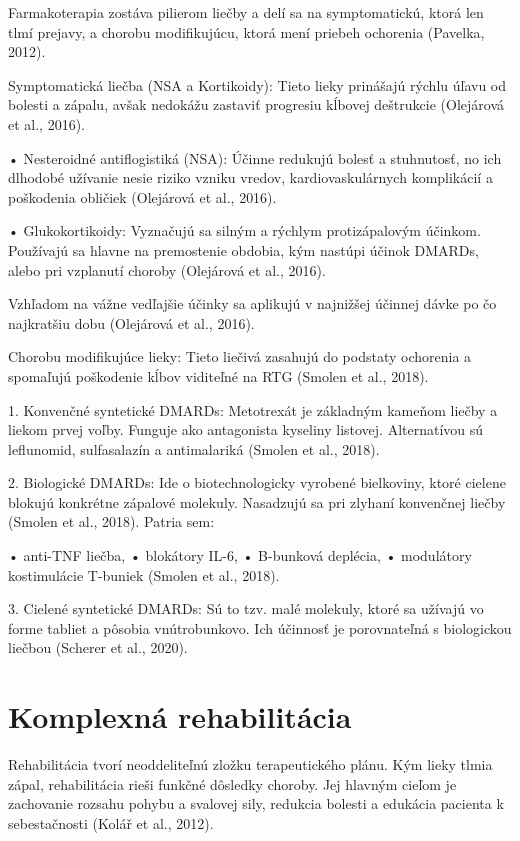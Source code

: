 Farmakoterapia zostáva pilierom liečby a delí sa na symptomatickú, ktorá len tlmí prejavy, a chorobu modifikujúcu, ktorá mení priebeh ochorenia (Pavelka, 2012). 

Symptomatická liečba (NSA a Kortikoidy): Tieto lieky prinášajú rýchlu úľavu od bolesti a zápalu, avšak nedokážu zastaviť progresiu kĺbovej deštrukcie (Olejárová et al., 2016). 

• Nesteroidné antiflogistiká (NSA): Účinne redukujú bolesť a stuhnutosť, no ich dlhodobé užívanie nesie riziko vzniku vredov, kardiovaskulárnych komplikácií a poškodenia obličiek (Olejárová et al., 2016). 

• Glukokortikoidy: Vyznačujú sa silným a rýchlym protizápalovým účinkom. Používajú sa hlavne na premostenie obdobia, kým nastúpi účinok DMARDs, alebo pri vzplanutí choroby (Olejárová et al., 2016). 

Vzhľadom na vážne vedľajšie účinky sa aplikujú v najnižšej účinnej dávke po čo najkratšiu dobu (Olejárová et al., 2016). 

Chorobu modifikujúce lieky: Tieto liečivá zasahujú do podstaty ochorenia a spomaľujú poškodenie kĺbov viditeľné na RTG (Smolen et al., 2018). 

1. Konvenčné syntetické DMARDs: Metotrexát je základným kameňom liečby a liekom prvej voľby. Funguje ako antagonista kyseliny listovej. Alternatívou sú leflunomid, sulfasalazín a antimalariká (Smolen et al., 2018). 

2. Biologické DMARDs: Ide o biotechnologicky vyrobené bielkoviny, ktoré cielene blokujú konkrétne zápalové molekuly. Nasadzujú sa pri zlyhaní konvenčnej liečby (Smolen et al., 2018). Patria sem: 

• anti-TNF liečba, • blokátory IL-6, • B-bunková deplécia, • modulátory kostimulácie T-buniek (Smolen et al., 2018). 

3. Cielené syntetické DMARDs: Sú to tzv. malé molekuly, ktoré sa užívajú vo forme tabliet a pôsobia vnútrobunkovo. Ich účinnosť je porovnateľná s biologickou liečbou (Scherer et al., 2020). 

\section{Komplexná rehabilitácia}

Rehabilitácia tvorí neoddeliteľnú zložku terapeutického plánu. Kým lieky tlmia zápal, rehabilitácia rieši funkčné dôsledky choroby. Jej hlavným cieľom je zachovanie rozsahu pohybu a svalovej sily, redukcia bolesti a edukácia pacienta k sebestačnosti (Kolář et al., 2012). 

